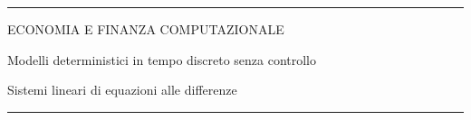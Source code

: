 \documentclass[12pt,aspectratio=169]{beamer}
\begin{document}
\begin{frame}
\unitlength 5mm

\begin{center}

\rule{\textwidth}{2pt}

\vskip3mm
ECONOMIA E FINANZA COMPUTAZIONALE

Modelli deterministici in tempo discreto senza controllo

Sistemi lineari di equazioni alle differenze
\rule{\textwidth}{2pt}

\end{center}

\end{frame}


\end{document}
